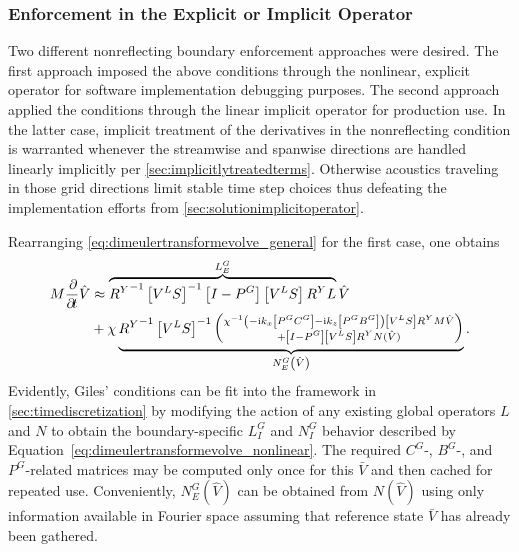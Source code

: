 \subsubsection{Enforcement in the Explicit or Implicit Operator}

Two different nonreflecting boundary enforcement approaches were desired.
The first approach imposed the above conditions through the nonlinear,
explicit operator for software implementation debugging purposes.  The second approach applied the conditions through
the linear implicit operator for production use.
In the latter case,
implicit treatment of the derivatives in the nonreflecting condition is warranted
whenever the streamwise and spanwise directions are handled linearly implicitly
per \autoref{sec:implicitlytreatedterms}.   Otherwise
acoustics traveling in those grid directions limit stable time step choices
thus
defeating the implementation efforts from \autoref{sec:solutionimplicitoperator}.

\label{sec:nrbc_mostly_explicit}
Rearranging \eqref{eq:dimeulertransformevolve_general} for the first case, one
obtains
\begin{align}
\label{eq:dimeulertransformevolve_nonlinear}
  M \frac{\partial\!}{\partial\!t}
  \hat{V}
&\approx
\overbrace{%
  {R^Y}^{-1}
  \left[V^L S\right]^{-1}
  \left[I-P^G\right] \left[V^L S\right] R^Y
  L
}^{L_E^G}
  \hat{V}
\notag\\
&{}+
  \chi
\underbrace{%
  {R^Y}^{-1}
  \left[V^L S\right]^{-1}
  \left(\substack{%
    \chi^{-1}
    \left(- \ii k_x \left[P^G C^G\right] - \ii k_z \left[P^G B^G\right] \right)
    \left[V^L S\right] R^Y M
    \hat{V}
    \\+
    \left[I - P^G\right] \left[V^L S\right] R^Y
    N(\hat{V})
  }\right)
}_{N_E^G\left(\hat{V}\right)}.
\end{align}
Evidently, Giles' conditions can be fit into the framework in
\autoref{sec:timediscretization} by modifying the action of any existing global
operators $L$ and $N$ to obtain the boundary-specific $L_I^G$ and $N_I^G$
behavior described by Equation~\eqref{eq:dimeulertransformevolve_nonlinear}. The
required $C^G$-, $B^G$-, and $P^G$-related matrices may be computed only once
for this $\bar{V}$ and then cached for repeated use.  Conveniently,
$N_E^G\left(\hat{V}\right)$ can be obtained from $N\left(\hat{V}\right)$ using
only information available in Fourier space assuming that reference state
$\bar{V}$ has already been gathered.

